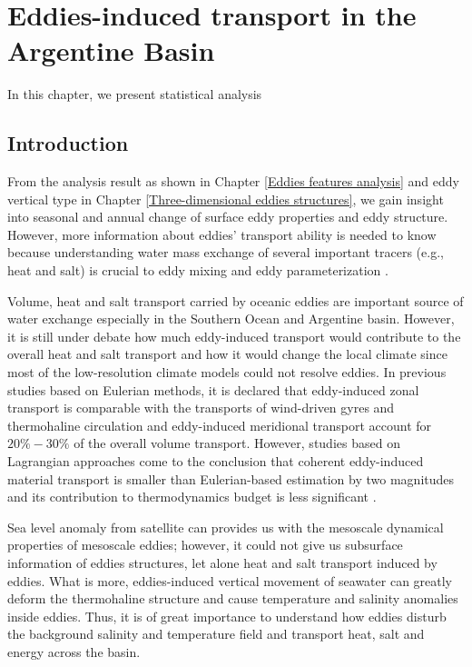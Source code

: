 \chapter{Eddies-induced transport in the Argentine Basin}

In this chapter, we present statistical analysis

\section{Introduction}

From the analysis result as shown in Chapter \ref{Eddies features analysis} and eddy vertical type in Chapter \ref{Three-dimensional eddies structures}, we gain insight into seasonal and annual change of surface eddy properties and eddy structure. However, more information about eddies' transport ability is needed to know because understanding water mass exchange of several important tracers (e.g., heat and salt) is crucial to eddy mixing and eddy parameterization \cite{guan2022seasonal}.

Volume, heat and salt transport carried by oceanic eddies are important source of water exchange especially in the Southern Ocean and Argentine basin. However, it is still under debate how much eddy-induced transport would contribute to the overall heat and salt transport and how it would change the local climate since most of the low-resolution climate models could not resolve eddies. In previous studies based on Eulerian methods, it is declared that eddy-induced zonal transport is comparable with the transports of wind-driven gyres and thermohaline circulation \cite{zhang2014oceanic} and eddy-induced meridional transport account for $20\%-30\%$ of the overall volume transport\cite{dong2014global}. However, studies based on Lagrangian approaches come to the conclusion that coherent eddy-induced material transport is smaller than Eulerian-based estimation by two magnitudes and its contribution to thermodynamics budget is less significant \cite{wang2015coherent}. 

Sea level anomaly from satellite can provides us with the mesoscale dynamical properties of mesoscale eddies; however, it could not give us subsurface information of eddies structures, let alone heat and salt transport induced by eddies. What is more, eddies-induced vertical movement of seawater can greatly deform the thermohaline structure and cause temperature and salinity anomalies inside eddies. Thus, it is of great importance to understand how eddies disturb the background salinity and temperature field and transport heat, salt and energy across the basin.


